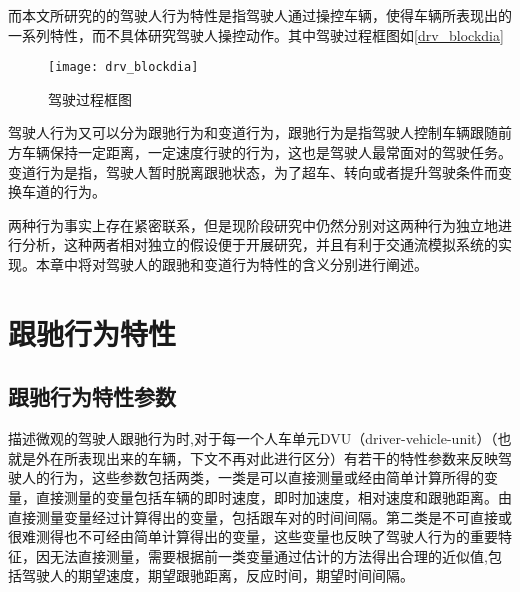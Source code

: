而本文所研究的的驾驶人行为特性是指驾驶人通过操控车辆，使得车辆所表现出的一系列特性，而不具体研究驾驶人操控动作。其中驾驶过程框图如\autoref{drv_blockdia}


\begin{figure}[!h]
	\centering
	\texttt{[image: drv\_blockdia]}
	\caption{驾驶过程框图}
	\label{drv_blockdia}
\end{figure}
驾驶人行为又可以分为跟驰行为和变道行为，跟驰行为是指驾驶人控制车辆跟随前方车辆保持一定距离，一定速度行驶的行为，这也是驾驶人最常面对的驾驶任务。变道行为是指，驾驶人暂时脱离跟驰状态，为了超车、转向或者提升驾驶条件而变换车道的行为。

两种行为事实上存在紧密联系，但是现阶段研究中仍然分别对这两种行为独立地进行分析，这种两者相对独立的假设便于开展研究，并且有利于交通流模拟系统的实现。本章中将对驾驶人的跟驰和变道行为特性的含义分别进行阐述。

\section{跟驰行为特性}


\subsection{跟驰行为特性参数}
描述微观的驾驶人跟驰行为时,对于每一个人车单元DVU（driver-vehicle-unit）（也就是外在所表现出来的车辆，下文不再对此进行区分）有若干的特性参数来反映驾驶人的行为，这些参数包括两类，一类是可以直接测量或经由简单计算所得的变量，直接测量的变量包括车辆的即时速度，即时加速度，相对速度和跟驰距离。由直接测量变量经过计算得出的变量，包括跟车对的时间间隔。第二类是不可直接或很难测得也不可经由简单计算得出的变量，这些变量也反映了驾驶人行为的重要特征，因无法直接测量，需要根据前一类变量通过估计的方法得出合理的近似值,包括驾驶人的期望速度，期望跟驰距离，反应时间，期望时间间隔。

